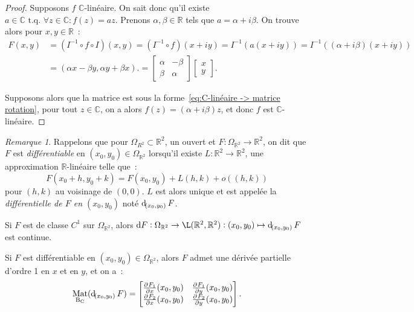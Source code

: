 \documentclass{report}
\theoremstyle{definition}
\theoremstyle{remark}
\newtheorem*{rmq}{Remarque}
\numberwithin{equation}{section}
\newcommand{\C}{\mathbb C}
\newcommand{\R}{\mathbb R}
\newcommand{\tq}{\text{ t.q. }}
\DeclareMathOperator{\Mat}{Mat}
\DeclareMathOperator{\MatBC}{\Mat_{B_C}}
\begin{document}
			\begin{proof} Supposons $f$ $\C$-linéaire. On sait donc qu'il existe $a \in \C \tq \forall z \in \C : f(z) = az$. Prenons $\alpha, \beta \in \R$ tels que
			$a = \alpha + i\beta$. On trouve alors pour $x, y \in \R$~:
			\begin{align}
				F(x, y) &= (I^{-1} \circ f \circ I)(x, y) = (I^{-1} \circ f)(x+iy) = I^{-1}(a(x+iy)) = I^{-1}((\alpha + i\beta)(x+iy)) \\
				&= \left(\alpha x - \beta y, \alpha y + \beta x\right). = \begin{bmatrix}\alpha & -\beta \\\beta & \alpha\end{bmatrix}\begin{bmatrix}x \\ y\end{bmatrix}.
			\end{align}

			Supposons alors que la matrice est sous la forme~\eqref{eq:C-linéaire -> matrice rotation}, pour tout $z \in \C$, on a alors $f(z) = (\alpha + i\beta)z$,
			et donc $f$ est $\C$-linéaire.
			\end{proof}

			\begin{rmq} Rappelons que pour $\Omega_{R^2} \subset \R^2$, un ouvert et $F : \Omega_{\R^2} \to \R^2$, on dit que $F$ est \textit{différentiable} en
			$(x_0, y_0) \in \Omega_{\R^2}$ lorsqu'il existe $L : \R^2 \to \R^2$, une approximation $\R$-linéaire telle que~:
			\begin{equation}
				F(x_0+h, y_0+k) = F(x_0, y_0) + L(h, k) + o((h, k))
			\end{equation}
			pour $(h, k)$ au voisinage de $(0, 0)$. $L$ est alors unique et est appelée la \textit{différentielle de $F$ en $(x_0, y_0)$} noté $\dif_{(x_0, y_0)}F$.

			Si $F$ est de classe $C^1$ sur $\Omega_{\R^2}$, alors $\dif F : \Omega_{\R^2} \to \L(\R^2, \R^2) : (x_0, y_0) \mapsto \dif_{(x_0, y_0)}F$ est continue.

			Si $F$ est différentiable en $(x_0, y_0) \in \Omega_{\R^2}$, alors $F$ admet une dérivée partielle d'ordre 1 en $x$ et en $y$, et on a~:
			\begin{equation}
				\MatBC(\dif_{(x_0, y_0)}F) = \begin{bmatrix}\pd {F_1}x(x_0, y_0) & \pd {F_1}y(x_0, y_0) \\ \pd {F_2}x(x_0, y_0) & \pd {F_2}y(x_0, y_0)\end{bmatrix}.
			\end{equation}
			\end{rmq}
\end{document}
